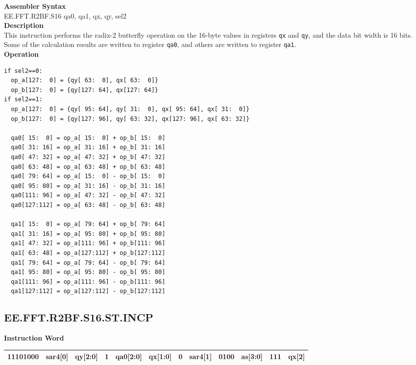 \textbf{Assembler Syntax} \\
EE.FFT.R2BF.S16 qa0, qa1, qx, qy, sel2 \\
\textbf{Description} \\
This instruction performs the radix-2 butterfly operation on the 16-byte values in registers \lstinline{qx} and \lstinline{qy}, and the data bit width is 16 bits. Some of the calculation results are written to register \lstinline{qa0}, and others are written to register \lstinline{qa1}.\\
\textbf{Operation}
\begin{lstlisting}
if sel2==0:
  op_a[127:  0] = {qy[ 63:  0], qx[ 63:  0]}
  op_b[127:  0] = {qy[127: 64], qx[127: 64]}
if sel2==1:
  op_a[127:  0] = {qy[ 95: 64], qy[ 31:  0], qx[ 95: 64], qx[ 31:  0]}
  op_b[127:  0] = {qy[127: 96], qy[ 63: 32], qx[127: 96], qx[ 63: 32]}

  qa0[ 15:  0] = op_a[ 15:  0] + op_b[ 15:  0]
  qa0[ 31: 16] = op_a[ 31: 16] + op_b[ 31: 16]
  qa0[ 47: 32] = op_a[ 47: 32] + op_b[ 47: 32]
  qa0[ 63: 48] = op_a[ 63: 48] + op_b[ 63: 48]
  qa0[ 79: 64] = op_a[ 15:  0] - op_b[ 15:  0]
  qa0[ 95: 80] = op_a[ 31: 16] - op_b[ 31: 16]
  qa0[111: 96] = op_a[ 47: 32] - op_b[ 47: 32]
  qa0[127:112] = op_a[ 63: 48] - op_b[ 63: 48]

  qa1[ 15:  0] = op_a[ 79: 64] + op_b[ 79: 64]
  qa1[ 31: 16] = op_a[ 95: 80] + op_b[ 95: 80]
  qa1[ 47: 32] = op_a[111: 96] + op_b[111: 96]
  qa1[ 63: 48] = op_a[127:112] + op_b[127:112]
  qa1[ 79: 64] = op_a[ 79: 64] - op_b[ 79: 64]
  qa1[ 95: 80] = op_a[ 95: 80] - op_b[ 95: 80]
  qa1[111: 96] = op_a[111: 96] - op_b[111: 96]
  qa1[127:112] = op_a[127:112] - op_b[127:112]
\end{lstlisting}

\clearpage
\subsection{EE.FFT.R2BF.S16.ST.INCP}\label{instruction:EEFFTR2BFS16STINCP}
\setlength\tabcolsep{6pt}
\textbf{Instruction Word} \\
\begin{tabular}{|c|c|c|c|c|c|c|c|c|c|c|c|}
	\hline
	11101000 & sar4[0] & qy[2:0] & 1 & qa0[2:0] & qx[1:0] & 0 & sar4[1] & 0100 & as[3:0] & 111 & qx[2] \\
	\hline
\end{tabular}

